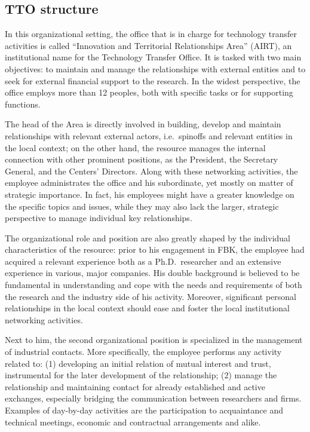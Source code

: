 \subsection{TTO structure}

In this organizational setting, the office that is in charge for technology transfer activities is called \enquote{Innovation and Territorial Relationships Area} (AIRT), an institutional name for the Technology Transfer Office. It is tasked with two main objectives: to maintain and manage the relationships with external entities and to seek for external financial support to the research. In the widest perspective, the office employs more than 12 peoples, both with specific tasks or for supporting functions. 

The head of the Area is directly involved in building, develop and maintain relationships with relevant external actors, i.e.\ spinoffs and relevant entities in the local context; on the other hand, the resource manages the internal connection with other prominent positions, as the President, the Secretary General, and the Centers' Directors. Along with these networking activities, the employee administrates the office and his subordinate, yet mostly on matter of strategic importance. In fact, his employees might have a greater knowledge on the specific topics and issues, while they may also lack the larger, strategic perspective to manage individual key relationships.

The organizational role and position are also greatly shaped by the individual characteristics of the resource: prior to his engagement in FBK, the employee had acquired a relevant experience both as a Ph.D.\ researcher and an extensive experience in various, major companies. His double background is believed to be fundamental in understanding and cope with the needs and requirements of both the research and the industry side of his activity. Moreover, significant personal relationships in the local context should ease and foster the local institutional networking activities.

Next to him, the second organizational position is specialized in the management of industrial contacts. More specifically, the employee performs any activity related to: (1) developing an initial relation of mutual interest and trust, instrumental for the later development of the relationship; (2) manage the relationship and maintaining contact for already established and active exchanges, especially bridging the communication between researchers and firms. Examples of day-by-day activities are the participation to acquaintance and technical meetings, economic and contractual arrangements and alike.

